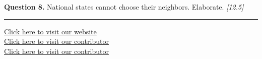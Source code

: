 \documentclass[11pt,a4paper]{article}
\newcommand{\pts}[1]{\hfill   \textit{[#1]}}
\begin{document}
\medskip


\noindent   \textbf{Question 8.} National states cannot choose their neighbors. Elaborate. \pts{12.5}

\vfill\rule{\linewidth}{0.4pt}

\begin{center}\small
\href{https://bhu-exam.vercel.app/}{Click here to visit our website}\\[4pt]
\href{https://me-aryan.vercel.app/}{Click here to visit our contributor}\\[4pt]
\href{https://quashan-me.vercel.app/}{Click here to visit our contributor}
\end{center}
\end{document}
